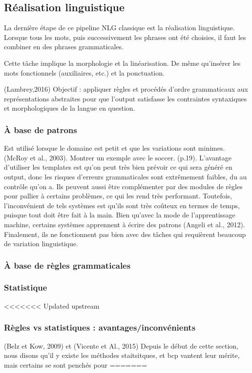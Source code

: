 \subsection{Réalisation linguistique}
La dernière étape de ce pipeline NLG classique est la réalisation linguistique. Lorsque tous les mots, puis successivement les phrases ont été choisies, il faut les combiner en des phrases grammaticales. 

Cette tâche implique la morphologie et la linéarisation. De même qu'insérer les mots fonctionnels (auxiliaires, etc.) et la ponctuation.

(Lambrey,2016) Objectif : appliquer règles et procédés d'ordre grammaticaux aux représentations abstraites pour que l'output satisfasse les contraintes syntaxiques et morphologiques de la langue en question.

\subsubsection{À base de patrons}
Est utilisé lorsque le domaine est petit et que les variations sont minimes. (McRoy et al., 2003). Montrer un exemple avec le soccer. (p.19).  L'avantage d'utiliser les templates est qu'on peut très bien prévoir ce qui sera généré en output, donc les risques d'erreurs grammaticales sont extrêmement faibles, du au contrôle qu'on a. Ils peuvent aussi être complémenter par des modules de règles pour pallier à certains problèmes, ce qui les rend très performant. Toutefois, l'inconvénient de tels systèmes est qu'ils sont très coûteux en termes de temps, puisque tout doit être fait à la main. Bien qu'avec la mode de l'apprentissage machine, certains systèmes apprennent à écrire des patrons (Angeli et al., 2012). Finalement, ils ne fonctionnent pas bien avec des tâches qui requièrent beaucoup de variation linguistique.

\subsubsection{À base de règles grammaticales}


\subsubsection{Statistique}

<<<<<<< Updated upstream
\subsubsection{Règles vs statistiques : avantages/inconvénients}
(Belz et Kow, 2009) et (Vicente et Al., 2015)
Depuis le début de cette section, nous disons qu'il y existe les méthodes staitsitques, et bcp vantent leur mérite, mais certains se sont penchés pour 
=======
